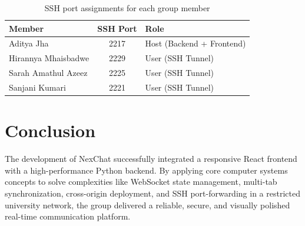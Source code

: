 \documentclass[12pt, a4paper]{article}
\begin{document}
\begin{table}[h]
\centering
\begin{tabular}{|l|c|l|}
\hline
\textbf{Member} & \textbf{SSH Port} & \textbf{Role} \\
\hline
Aditya Jha & 2217 & Host (Backend + Frontend) \\
Hirannya Mhaisbadwe & 2229 & User (SSH Tunnel) \\
Sarah Amathul Azeez & 2225 & User (SSH Tunnel) \\
Sanjani Kumari & 2221 & User (SSH Tunnel) \\
\hline
\end{tabular}
\caption{SSH port assignments for each group member}
\end{table}

\section{Conclusion}
The development of NexChat successfully integrated a responsive React frontend with a high-performance Python backend. By applying core computer systems concepts to solve complexities like WebSocket state management, multi-tab synchronization, cross-origin deployment, and SSH port-forwarding in a restricted university network, the group delivered a reliable, secure, and visually polished real-time communication platform.
\end{document}
